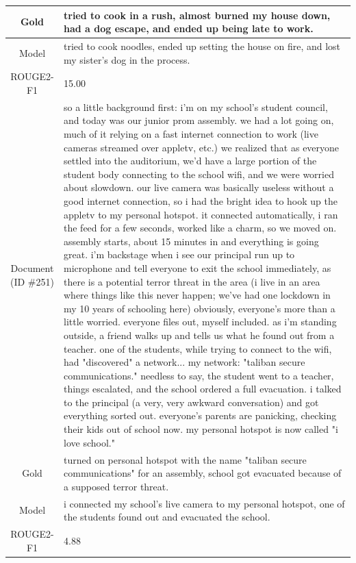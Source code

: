 \begin{table}[bth!]
\begin{tabular}{c|p{}}
\\ \hline
Gold & 
tried to cook in a rush, almost burned my house down, had a dog escape, and ended up being late to work.
\\ \hline
Model & 
tried to cook noodles, ended up setting the house on fire, and lost my sister’s dog in the process.
\\ \hline
ROUGE2-F1 & 
15.00
\\ \hline
\makecell{Document\\(ID \#251)} & 
so a little background first: i'm on my school's student council, and today was our junior prom assembly. we had a lot going on, much of it relying on a fast internet connection to work (live cameras streamed over appletv, etc.) we realized that as everyone settled into the auditorium, we'd have a large portion of the student body connecting to the school wifi, and we were worried about slowdown. our live camera was basically useless without a good internet connection, so i had the bright idea to hook up the appletv to my personal hotspot. it connected automatically, i ran the feed for a few seconds, worked like a charm, so we moved on. assembly starts, about 15 minutes in and everything is going great. i'm backstage when i see our principal run up to microphone and tell everyone to exit the school immediately, as there is a potential terror threat in the area (i live in an area where things like this never happen; we've had one lockdown in my 10 years of schooling here) obviously, everyone's more than a little worried. everyone files out, myself included. as i'm standing outside, a friend walks up and tells us what he found out from a teacher. one of the students, while trying to connect to the wifi, had "discovered" a network... my network: "taliban secure communications." needless to say, the student went to a teacher, things escalated, and the school ordered a full evacuation. i talked to the principal (a very, very awkward conversation) and got everything sorted out. everyone's parents are panicking, checking their kids out of school now. my personal hotspot is now called "i love school."
\\ \hline
Gold & 
turned on personal hotspot with the name "taliban secure communications" for an assembly, school got evacuated because of a supposed terror threat.
\\ \hline
Model & 
i connected my school's live camera to my personal hotspot, one of the students found out and evacuated the school.
\\ \hline
ROUGE2-F1 & 
4.88
\\ \hline

\end{tabular}
\end{table}
